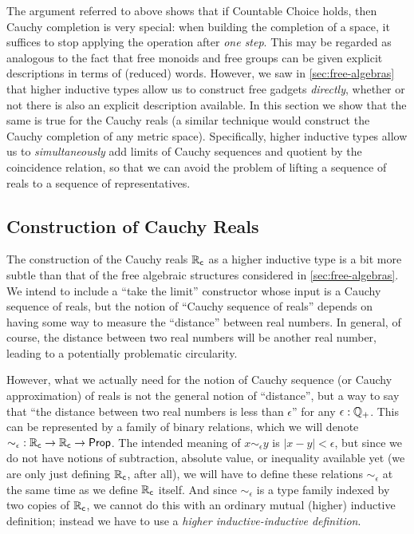 The argument referred to above shows that if Countable Choice holds, then Cauchy completion is very special: when building the completion of a space, it suffices to stop applying the operation after \emph{one step}.
This may be regarded as analogous to the fact that free monoids and free groups can be given explicit descriptions in terms of (reduced) words.
However, we saw in \autoref{sec:free-algebras} that higher inductive types allow us to construct free gadgets \emph{directly}, whether or not there is also an explicit description available.
In this section we show that the same is true for the Cauchy reals (a similar technique would construct the Cauchy completion of any metric space).
Specifically, higher inductive types allow us to \emph{simultaneously} add limits of Cauchy sequences and quotient by the coincidence relation, so that we can avoid the problem of lifting a sequence of reals to a sequence of representatives.


\subsection{Construction of Cauchy Reals}
\label{sec:constr-cauchy-reals}

The construction of the Cauchy reals $\mathbb{R}_\mathsf{c}$ as a higher inductive type is a bit more subtle than that of the free algebraic structures considered in \autoref{sec:free-algebras}.
We intend to include a ``take the limit'' constructor whose input is a Cauchy sequence of reals, but the notion of ``Cauchy sequence of reals'' depends on having some way to measure the ``distance'' between real numbers.
In general, of course, the distance between two real numbers will be another real number, leading to a potentially problematic circularity.

However, what we actually need for the notion of Cauchy sequence (or Cauchy approximation) of reals is not the general notion of ``distance'', but a way to say that ``the distance between two real numbers is less than $\epsilon$'' for any $\epsilon:\mathbb{Q}_{+}$.
This can be represented by a family of binary relations, which we will denote $\mathord{\sim_\epsilon} : \mathbb{R}_\mathsf{c}\to\mathbb{R}_\mathsf{c}\to \mathsf{Prop}$.
The intended meaning of $x \sim_\epsilon y$ is $|x - y| < \epsilon$, but since we do not have notions of subtraction, absolute value, or inequality available yet (we are only just defining $\mathbb{R}_\mathsf{c}$, after all), we will have to define these relations $\sim_\epsilon$ at the same time as we define $\mathbb{R}_\mathsf{c}$ itself.
And since $\sim_\epsilon$ is a type family indexed by two copies of $\mathbb{R}_\mathsf{c}$, we cannot do this with an ordinary mutual (higher) inductive definition; instead we have to use a \emph{higher inductive-inductive definition}.

